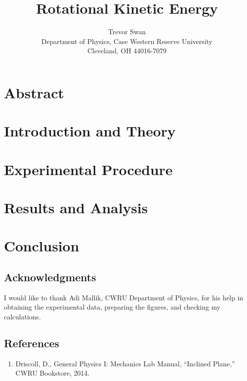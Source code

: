 \documentclass[12pt]{article}
\title{Rotational Kinetic Energy}
\author{Trevor Swan \\
Department of Physics, Case Western Reserve University \\
Cleveland, OH 44016-7079}
\date{}
\begin{document}
\pagestyle{fancy}
\fancyhf{}

\maketitle
\thispagestyle{fancy}
\renewcommand{\headrulewidth}{0pt}

\fancyfoot[C]{\thepage}

\section{Abstract}
\lipsum[1]

\section{Introduction and Theory}
\lipsum[2]

\section{Experimental Procedure}
\lipsum[3]

\section{Results and Analysis}
\lipsum[4]

\section{Conclusion}
\lipsum[6]

\subsection{Acknowledgments}
I would like to thank Adi Mallik, CWRU Department of Physics, for his help in obtaining the experimental data, preparing the figures, and checking my calculations.

\subsection{References}
\begin{enumerate}
    \item Driscoll, D., General Physics I: Mechanics Lab Manual, “Inclined Plane,” CWRU Bookstore, 2014.
\end{enumerate}
\end{document}
